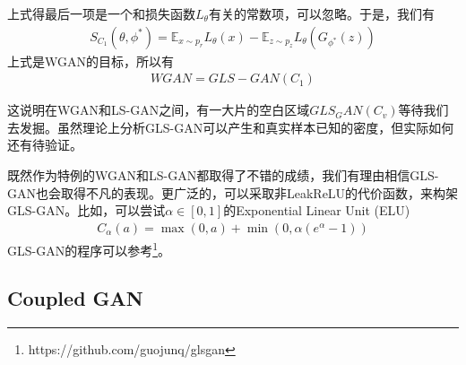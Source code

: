             上式得最后一项是一个和损失函数$L_\theta$有关的常数项，可以忽略。于是，我们有
            \begin{align*}
            S_{C_1}(\theta,\phi^*) = \mathbb{E}_{x\sim p_r}L_\theta(x) - \mathbb{E}_{z\sim p_z}L_\theta(G_{\phi^*}(z))
            \end{align*}
            上式是WGAN的目标，所以有
            \begin{align*}
            WGAN = GLS-GAN(C_1)
            \end{align*}
            \par
            这说明在WGAN和LS-GAN之间，有一大片的空白区域$GLS_GAN(C_v)$等待我们去发掘。虽然理论上分析GLS-GAN可以产生和真实样本已知的密度，但实际如何还有待验证。
            \par
            既然作为特例的WGAN和LS-GAN都取得了不错的成绩，我们有理由相信GLS-GAN也会取得不凡的表现。更广泛的，可以采取非LeakReLU的代价函数，来构架GLS-GAN。比如，可以尝试$\alpha\in [0,1]$的Exponential Linear Unit (ELU)
            \begin{align*}
            C_\alpha(a) = \max (0,a)+\min(0,\alpha(e^\alpha-1))
            \end{align*}
            GLS-GAN的程序可以参考\footnote{https://github.com/guojunq/glsgan}。

    \subsection{Coupled GAN}

